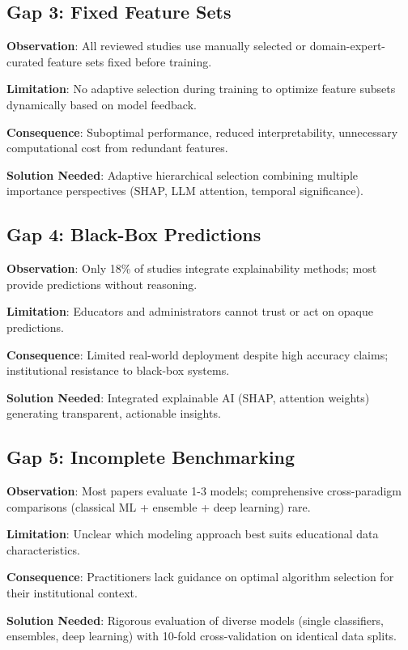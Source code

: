 \subsection{Gap 3: Fixed Feature Sets}

\textbf{Observation}: All reviewed studies use manually selected or domain-expert-curated feature sets fixed before training.

\textbf{Limitation}: No adaptive selection during training to optimize feature subsets dynamically based on model feedback.

\textbf{Consequence}: Suboptimal performance, reduced interpretability, unnecessary computational cost from redundant features.

\textbf{Solution Needed}: Adaptive hierarchical selection combining multiple importance perspectives (SHAP, LLM attention, temporal significance).

\subsection{Gap 4: Black-Box Predictions}

\textbf{Observation}: Only 18\% of studies integrate explainability methods; most provide predictions without reasoning.

\textbf{Limitation}: Educators and administrators cannot trust or act on opaque predictions.

\textbf{Consequence}: Limited real-world deployment despite high accuracy claims; institutional resistance to black-box systems.

\textbf{Solution Needed}: Integrated explainable AI (SHAP, attention weights) generating transparent, actionable insights.

\subsection{Gap 5: Incomplete Benchmarking}

\textbf{Observation}: Most papers evaluate 1-3 models; comprehensive cross-paradigm comparisons (classical ML + ensemble + deep learning) rare.

\textbf{Limitation}: Unclear which modeling approach best suits educational data characteristics.

\textbf{Consequence}: Practitioners lack guidance on optimal algorithm selection for their institutional context.

\textbf{Solution Needed}: Rigorous evaluation of diverse models (single classifiers, ensembles, deep learning) with 10-fold cross-validation on identical data splits.

